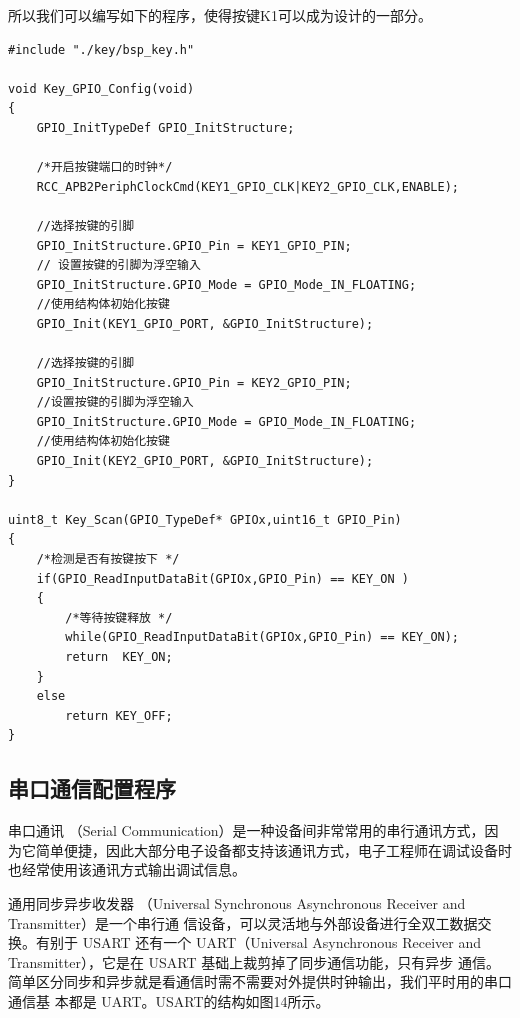 \documentclass[UTF8,a4paper,11pt]{article}
\begin{document}
所以我们可以编写如下的程序，使得按键K1可以成为设计的一部分。
\begin{lstlisting}[caption={}]
#include "./key/bsp_key.h"  

void Key_GPIO_Config(void)
{
	GPIO_InitTypeDef GPIO_InitStructure;
	
	/*开启按键端口的时钟*/
	RCC_APB2PeriphClockCmd(KEY1_GPIO_CLK|KEY2_GPIO_CLK,ENABLE);
	
	//选择按键的引脚
	GPIO_InitStructure.GPIO_Pin = KEY1_GPIO_PIN; 
	// 设置按键的引脚为浮空输入
	GPIO_InitStructure.GPIO_Mode = GPIO_Mode_IN_FLOATING; 
	//使用结构体初始化按键
	GPIO_Init(KEY1_GPIO_PORT, &GPIO_InitStructure);
	
	//选择按键的引脚
	GPIO_InitStructure.GPIO_Pin = KEY2_GPIO_PIN; 
	//设置按键的引脚为浮空输入
	GPIO_InitStructure.GPIO_Mode = GPIO_Mode_IN_FLOATING; 
	//使用结构体初始化按键
	GPIO_Init(KEY2_GPIO_PORT, &GPIO_InitStructure);	
}

uint8_t Key_Scan(GPIO_TypeDef* GPIOx,uint16_t GPIO_Pin)
{			
	/*检测是否有按键按下 */
	if(GPIO_ReadInputDataBit(GPIOx,GPIO_Pin) == KEY_ON )  
	{	 
		/*等待按键释放 */
		while(GPIO_ReadInputDataBit(GPIOx,GPIO_Pin) == KEY_ON);   
		return 	KEY_ON;	 
	}
	else
		return KEY_OFF;
}
\end{lstlisting}

\subsection{串口通信配置程序}
串口通讯 （Serial Communication）是一种设备间非常常用的串行通讯方式，因为它简单便捷，因此大部分电子设备都支持该通讯方式，电子工程师在调试设备时也经常使用该通讯方式输出调试信息。

通用同步异步收发器 （Universal Synchronous Asynchronous Receiver and Transmitter）是一个串行通
信设备，可以灵活地与外部设备进行全双工数据交换。有别于 USART 还有一个 UART（Universal
Asynchronous Receiver and Transmitter），它是在 USART 基础上裁剪掉了同步通信功能，只有异步
通信。简单区分同步和异步就是看通信时需不需要对外提供时钟输出，我们平时用的串口通信基
本都是 UART。USART的结构如图14所示。
\end{document}
